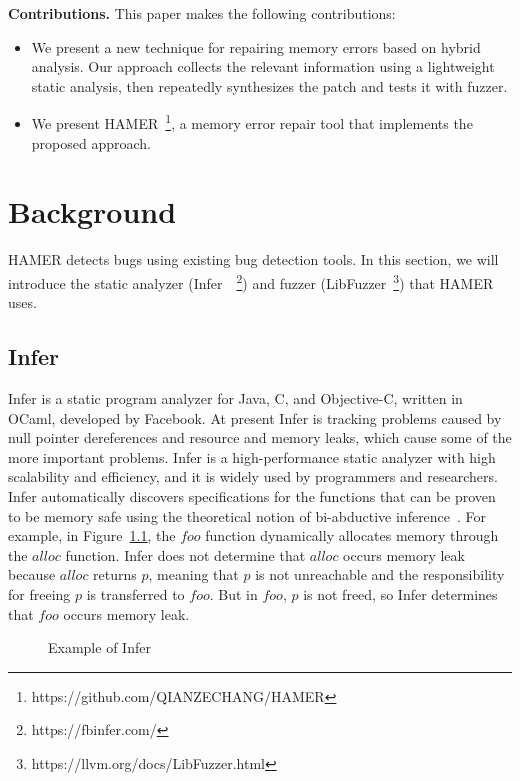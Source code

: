 \documentclass[a4paper,11pt,oneside,openany]{book}
\begin{document}
\textbf{Contributions.} This paper makes the following contributions:
\begin{itemize}
  \item We present a new technique for repairing memory errors based on hybrid analysis. Our approach collects the relevant information using a lightweight static analysis, then repeatedly synthesizes the patch and tests it with fuzzer.
  \item We present HAMER~\footnote{https://github.com/QIANZECHANG/HAMER}, a memory error repair tool that implements the proposed approach.
\end{itemize}


\chapter{Background}

HAMER detects bugs using existing bug detection tools. In this section, we will introduce the static analyzer (Infer~\cite{infer}~\footnote{https://fbinfer.com/}) and fuzzer (LibFuzzer~\footnote{https://llvm.org/docs/LibFuzzer.html}) that HAMER uses.

\section{Infer}

Infer is a static program analyzer for Java, C, and Objective-C, written in OCaml, developed by Facebook. At present Infer is tracking problems caused by null pointer dereferences and resource and memory leaks, which cause some of the more important problems. Infer is a high-performance static analyzer with high scalability and efficiency, and it is widely used by programmers and researchers. Infer automatically discovers specifications for the functions that can be proven to be memory safe using the theoretical notion of bi-abductive inference~\cite{bi}. For example, in Figure~\ref{inferexample}, the $foo$ function dynamically allocates memory through the $alloc$ function. Infer does not determine that $alloc$ occurs memory leak because $alloc$ returns $p$, meaning that $p$ is not unreachable and the responsibility for freeing $p$ is transferred to $foo$. But in $foo$, $p$ is not freed, so Infer determines that $foo$ occurs memory leak.

\begin{figure}[h]
    
    \caption{Example of Infer}
    \label{inferexample}
\end{figure}
\end{document}
